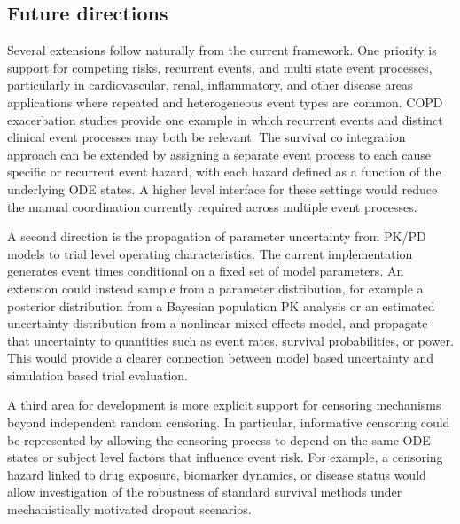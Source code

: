 \subsection{Future directions}\label{future-directions}

Several extensions follow naturally from the current framework. One priority is support for competing risks, recurrent events, and multi state event processes, particularly in cardiovascular, renal, inflammatory, and other disease areas applications where repeated and heterogeneous event types are common. COPD exacerbation studies provide one example in which recurrent events and distinct clinical event processes may both be relevant. The survival co integration approach can be extended by assigning a separate event process to each cause specific or recurrent event hazard, with each hazard defined as a function of the underlying ODE states. A higher level interface for these settings would reduce the manual coordination currently required across multiple event processes.

A second direction is the propagation of parameter uncertainty from PK/PD models to trial level operating characteristics. The current implementation generates event times conditional on a fixed set of model parameters. An extension could instead sample from a parameter distribution, for example a posterior distribution from a Bayesian population PK analysis or an estimated uncertainty distribution from a nonlinear mixed effects model, and propagate that uncertainty to quantities such as event rates, survival probabilities, or power. This would provide a clearer connection between model based uncertainty and simulation based trial evaluation.

A third area for development is more explicit support for censoring mechanisms beyond independent random censoring. In particular, informative censoring could be represented by allowing the censoring process to depend on the same ODE states or subject level factors that influence event risk. For example, a censoring hazard linked to drug exposure, biomarker dynamics, or disease status would allow investigation of the robustness of standard survival methods under mechanistically motivated dropout scenarios.



\address{%
Carlos Serra Traynor\\
Clinical Pharmacology \& Quantitative Pharmacology, Clinical Pharmacology \& Safety Sciences, R\&D BioPharmaceuticals, AstraZeneca\\%
Barcelona, Spain\\
%
%
%
\href{mailto:carlos.traynor.qcp@gmail.com}{\nolinkurl{carlos.traynor.qcp@gmail.com}}%
}
